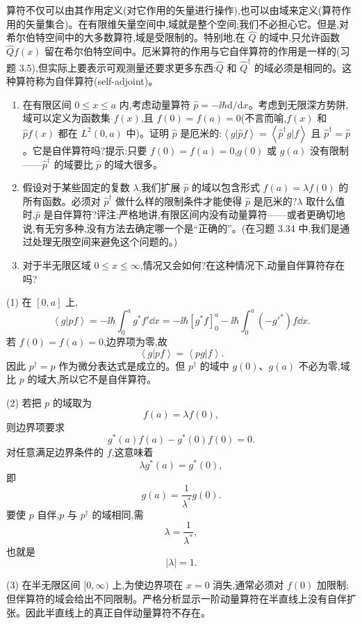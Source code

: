 \begin{question}
算符不仅可以由其作用定义(对它作用的矢量进行操作),也可以由域来定义(算符作用的矢量集合)。在有限维矢量空间中,域就是整个空间;我们不必担心它。但是,对希尔伯特空间中的大多数算符,域是受限制的。特别地,在 $\hat Q$ 的域中,只允许函数 $\hat Q f(x)$ 留在希尔伯特空间中。厄米算符的作用与它自伴算符的作用是一样的(习题 3.5),但实际上要表示可观测量还要求更多东西:$\hat Q$ 和 $\hat Q^\dagger$ 的域必须是相同的。这种算符称为自伴算符(self-adjoint)。
\begin{enumerate}
\item 在有限区间 $0\leq x\leq a$ 内,考虑动量算符 $\hat p=-\ii\hbar\mathrm d/\mathrm dx$。考虑到无限深方势阱,域可以定义为函数集 $f(x)$,且 $f(0)=f(a)=0$(不言而喻,$f(x)$ 和 $\hat p f(x)$ 都在 $L^2(0,a)$ 中)。证明 $\hat p$ 是厄米的:$\left\langle g|\hat p f \right\rangle=\left\langle \hat p^\dagger g|f \right\rangle$ 且 $\hat p^\dagger=\hat p$。它是自伴算符吗?提示:只要 $f(0)=f(a)=0$,$g(0)$ 或 $g(a)$ 没有限制——$\hat p^\dagger$ 的域要比 $\hat p$ 的域大很多。
\item 假设对于某些固定的复数 $\lambda$,我们扩展 $\hat p$ 的域以包含形式 $f(a)=\lambda f(0)$ 的所有函数。必须对 $\hat p^\dagger$ 做什么样的限制条件才能使得 $\hat p$ 是厄米的?$\lambda$ 取什么值时,$\hat p$ 是自伴算符?评注:严格地讲,有限区间内没有动量算符——或者更确切地说,有无穷多种,没有方法去确定哪一个是“正确的”。(在习题 3.34 中,我们是通过处理无限空间来避免这个问题的。)
\item 对于半无限区域 $0\leq x\leq\infty$,情况又会如何?在这种情况下,动量自伴算符存在吗?
\end{enumerate}
\begin{solution}
(1) 在 $[0,a]$ 上,
\[
\left\langle g|pf \right\rangle=-\ii\hbar\int_0^ag^*f'\dd x
=-\ii\hbar[g^*f]_0^a-\ii\hbar\int_0^a(-g'^*)f\dd x.
\]
若 $f(0)=f(a)=0$,边界项为零,故
\[
\left\langle g|pf \right\rangle=\left\langle pg|f \right\rangle.
\]
因此 $p^\dagger=p$ 作为微分表达式是成立的。但 $p^\dagger$ 的域中 $g(0)$、$g(a)$ 不必为零,域比 $p$ 的域大,所以它不是自伴算符。

(2) 若把 $p$ 的域取为
\[
f(a)=\lambda f(0),
\]
则边界项要求
\[
g^*(a)f(a)-g^*(0)f(0)=0.
\]
对任意满足边界条件的 $f$,这意味着
\[
\lambda g^*(a)=g^*(0),
\]
即
\[
\boxed{g(a)=\frac{1}{\lambda^*}g(0).}
\]
要使 $p$ 自伴,$p$ 与 $p^\dagger$ 的域相同,需
\[
\lambda=\frac1{\lambda^*},
\]
也就是
\[
\boxed{|\lambda|=1.}
\]

(3) 在半无限区间 $[0,\infty)$ 上,为使边界项在 $x=0$ 消失,通常必须对 $f(0)$ 加限制;但伴算符的域会给出不同限制。严格分析显示一阶动量算符在半直线上没有自伴扩张。因此半直线上的真正自伴动量算符不存在。
\end{solution}
\end{question}

